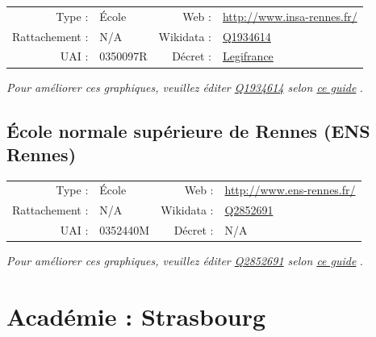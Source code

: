 \documentclass[11pt,french,landscape]{article}
\begin{document}
\begin{tabular*}{0.45\textwidth}{rp{2cm}rl}  
\hline  
Type : & École & Web : &\href{http://www.insa-rennes.fr/}{http://www.insa-rennes.fr/} \\  
Rattachement : & N/A & Wikidata : & \href{https://www.wikidata.org/entity/Q1934614}{Q1934614} \\  
UAI : & 0350097R & Décret : & \href{Abrogé}{Legifrance} \\  
\hline  
\end{tabular*}

\textit{\scriptsize Pour améliorer ces graphiques, veuillez éditer \href{https://www.wikidata.org/entity/Q1934614}{Q1934614}  selon \href{https://github.com/cpesr/wikidataESR/blob/master/Rmd/wikidataESR.md}{ce guide}}
.


\newpage

\hypertarget{uxe9cole-normale-supuxe9rieure-de-rennes-ens-rennes}{%
\subsection{École normale supérieure de Rennes (ENS
Rennes)}\label{uxe9cole-normale-supuxe9rieure-de-rennes-ens-rennes}}

\begin{tabular*}{0.45\textwidth}{rp{2cm}rl}  
\hline  
Type : & École & Web : &\href{http://www.ens-rennes.fr/}{http://www.ens-rennes.fr/} \\  
Rattachement : & N/A & Wikidata : & \href{https://www.wikidata.org/entity/Q2852691}{Q2852691} \\  
UAI : & 0352440M & Décret : & N/A \\  
\hline  
\end{tabular*}

\textit{\scriptsize Pour améliorer ces graphiques, veuillez éditer \href{https://www.wikidata.org/entity/Q2852691}{Q2852691}  selon \href{https://github.com/cpesr/wikidataESR/blob/master/Rmd/wikidataESR.md}{ce guide}}
.


\newpage

\hypertarget{acaduxe9mie-strasbourg-1}{%
\section{Académie : Strasbourg}\label{acaduxe9mie-strasbourg-1}}
\end{document}
